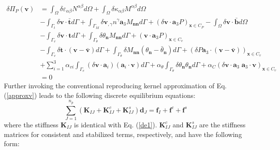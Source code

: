 \begin{equation}
\begin{split}
\delta \Pi_P(\boldsymbol v) &= \int_\Omega\delta \varepsilon_{\alpha\beta} N^{\alpha\beta} d\Omega +
\int_\Omega \delta \kappa_{\alpha\beta}M^{\alpha\beta} d\Omega \\
                     &- \int_{\Gamma_t} \delta \boldsymbol v \cdot \bar{\boldsymbol t} d\Gamma 
                     + \int_{\Gamma_M} \delta \boldsymbol v_{,\gamma} n^\gamma \boldsymbol a_3 M_{\boldsymbol{nn}} d\Gamma
                     + (\delta \boldsymbol v \cdot \boldsymbol a_3 P)_{\boldsymbol x \in C_P}
                     - \int_\Omega \delta \boldsymbol v \cdot \bar{\boldsymbol b} d\Omega \\
                     &- \int_{\Gamma_v} \delta \boldsymbol v \cdot \boldsymbol t d\Gamma 
                     + \int_{\Gamma_\theta} \delta \theta_{\boldsymbol n} M_{\boldsymbol{nn}}d\Gamma 
                     + (\boldsymbol v \cdot \boldsymbol a_3 P)_{\boldsymbol x \in C_v}\\
                     &- \int_{\Gamma_v} \delta \boldsymbol t \cdot (\boldsymbol v - \bar{\boldsymbol v}) d\Gamma
                     + \int_{\Gamma_\theta} \delta M_{\boldsymbol{nn}}(\theta_{\boldsymbol n} - \bar \theta_{\boldsymbol n})d\Gamma
                     + (\delta P\boldsymbol a_3 \cdot (\boldsymbol v - \bar{\boldsymbol v}))_{\boldsymbol x \in C_v} \\
                     &+ \sum_{i=1}^{3}\alpha_{vi} \int_{\Gamma_v} (\delta \boldsymbol v \cdot \boldsymbol a_i) (\boldsymbol a_i \cdot \boldsymbol v) d\Gamma 
                     + \alpha_\theta \int_{\Gamma_\theta} \delta \theta_{\boldsymbol n}\theta_{\boldsymbol n} d\Gamma
                     + \alpha_C(\delta \boldsymbol v \cdot \boldsymbol a_3 \; \boldsymbol a_3 \cdot \boldsymbol v)_{\boldsymbol x\in C_v} \\
                     &= 0
\end{split}
\end{equation}
Further invoking the conventional reproducing kernel approximation of Eq. (\ref{approxv}) leads to the following discrete equilibrium equations:
\begin{equation}
\sum_{J=1}^{n_p}(\boldsymbol K_{IJ} + \boldsymbol K^c_{IJ} + \boldsymbol K^s_{IJ}) \boldsymbol d_J = \boldsymbol f_I + \boldsymbol f^c + \boldsymbol f^s
\end{equation}
where the stiffness $\boldsymbol K_{IJ}$ is identical with Eq. (\ref{de1}). $\boldsymbol K^c_{IJ}$ and $\boldsymbol K^s_{IJ}$ are the stiffness matrices for consistent and stabilized terms, respectively, and have the following form:
